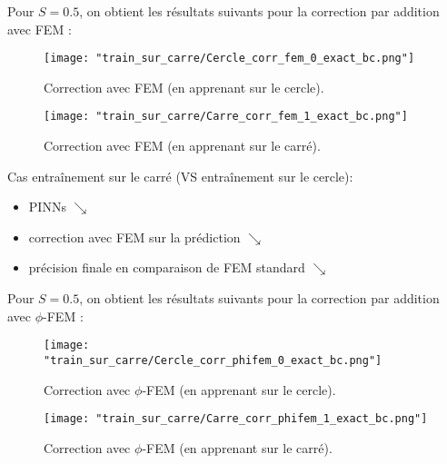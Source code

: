 Pour $S=0.5$, on obtient les résultats suivants pour la correction par addition avec FEM :

\vspace{-20pt}
\begin{center}
	\begin{minipage}{0.48\linewidth}
		\begin{figure}[H]
			\centering
			\texttt{[image: "train\_sur\_carre/Cercle\_corr\_fem\_0\_exact\_bc.png"]}
			\caption{Correction avec FEM (en apprenant sur le cercle).}
		\end{figure}
	\end{minipage}
	\begin{minipage}{0.48\linewidth}
		\begin{figure}[H]
			\centering
			\texttt{[image: "train\_sur\_carre/Carre\_corr\_fem\_1\_exact\_bc.png"]}
			\caption{Correction avec FEM (en apprenant sur le carré).}
		\end{figure}
	\end{minipage}
\end{center}

\newpage

\begin{Obs}
	Cas entraînement sur le carré (VS entraînement sur le cercle):
	\begin{itemize}
		\item PINNs $\searrow$
		\item correction avec FEM sur la prédiction $\searrow$
		\item précision finale en comparaison de FEM standard $\searrow$
	\end{itemize}
\end{Obs}

Pour $S=0.5$, on obtient les résultats suivants pour la correction par addition avec $\phi$-FEM :

\begin{minipage}{0.48\linewidth}
	\begin{figure}[H]
		\centering
		\texttt{[image: "train\_sur\_carre/Cercle\_corr\_phifem\_0\_exact\_bc.png"]}
		\caption{Correction avec $\phi$-FEM (en apprenant sur le cercle).}
	\end{figure}
\end{minipage}
\begin{minipage}{0.48\linewidth}
	\begin{figure}[H]
		\centering
		\texttt{[image: "train\_sur\_carre/Carre\_corr\_phifem\_1\_exact\_bc.png"]}
		\caption{Correction avec $\phi$-FEM (en apprenant sur le carré).}
	\end{figure}
\end{minipage}


